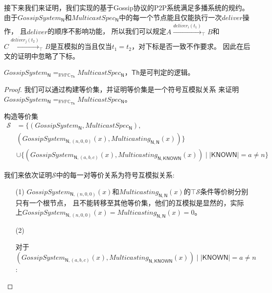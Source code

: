  接下来我们来证明，我们实现的基于Gossip协议的P2P系统满足多播系统的规约。
 由于$GossipSystem_{\mathsf{N}}$和$MulticastSpec_\mathsf{N}$中的每一个节点能且仅能执行一次$deliver$操作，
 且$deliver$的顺序不影响功能，
所以我们可以规定$A\stackrel{\overline{deliver_i}(t_1)}{\longrightarrow}_{\top} B$和$C\stackrel{\overline{deliver_j}(t_2)}{\longrightarrow}_{\top}B$是互模拟的当且仅当$t_1=t_2$，对下标是否一致不作要求。
因此在后文的证明中忽略了下标。
\begin{theorem}
    $GossipSystem_{\mathsf{N}} =_{\mathbb{RVPC}_{\mathsf{Th}}} MulticastSpec_{\mathsf{N}}$，$\mathsf{Th}$是可判定的逻辑。
\end{theorem}
\begin{proof}

我们可以通过构建等价集，并证明等价集是一个符号互模拟关系
来证明$GossipSystem_{\mathsf{N}} =_{\mathbb{RVPC}_{\mathsf{Th}}} MulticastSpec_{\mathsf{N}}$。

构造等价集
\begin{equation}
   \begin{split}
      \mathcal{S}&=\{(GossipSystem_{\mathsf{N}}, MulticastSpec_{\mathsf{N}}), \\
      &(GossipSystem_{\mathsf{N},(n,0,0)}(x), Multicasting_{\mathsf{N},\mathsf{N}}(x))\}\\
      & \cup \{(GossipSystem_{\mathsf{N},(a,b,c)}(x), Multicasting_{\mathsf{N}, \mathsf{KNOWN}}(x))\mid |\mathsf{KNOWN}| = a\neq n\}
   \end{split}
\end{equation}

我们来依次证明$\mathcal{S}$中的每一对等价关系为符号互模拟关系:
\begin{itemize}
    \item[(1)] {
       $GossipSystem_{\mathsf{N},(n,0,0)}(x)$和$Multicasting_{\mathsf{N},\mathsf{N}}(x)$的$\top \mathcal{S}$条件等价树分别只有一个根节点，
       且不能转移至其他等价集，他们的互模拟是显然的，实际上$GossipSystem_{\mathsf{N},(n,0,0)}(x)=Multicasting_{\mathsf{N},\mathsf{N}}(x)=0$。
    }
    \item[(2)] {
        对于$(GossipSystem_{\mathsf{N},(a,b,c)}(x), Multicasting_{\mathsf{N}, \mathsf{KNOWN}}(x))\mid |\mathsf{KNOWN}| = a\neq n$:

}
\end{itemize}
\end{proof}
